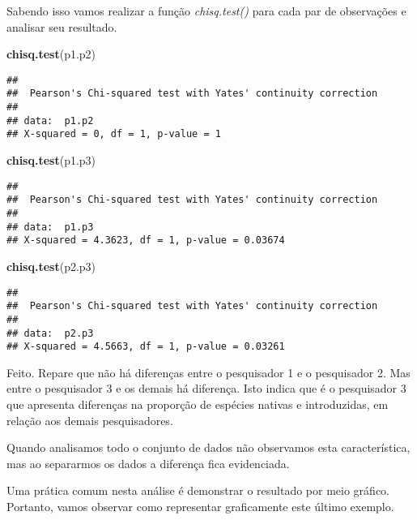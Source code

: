 \documentclass[]{book}
\newenvironment{Shaded}{\begin{snugshade}}{\end{snugshade}}
\newcommand{\KeywordTok}[1]{\textcolor[rgb]{0.13,0.29,0.53}{\textbf{#1}}}
\newcommand{\NormalTok}[1]{#1}
\begin{document}
Sabendo isso vamos realizar a função \emph{chisq.test()} para cada par de observações e analisar seu resultado.

\begin{Shaded}
\begin{Highlighting}[]
\KeywordTok{chisq.test}\NormalTok{(p1.p2)}
\end{Highlighting}
\end{Shaded}

\begin{verbatim}
## 
##  Pearson's Chi-squared test with Yates' continuity correction
## 
## data:  p1.p2
## X-squared = 0, df = 1, p-value = 1
\end{verbatim}

\begin{Shaded}
\begin{Highlighting}[]
\KeywordTok{chisq.test}\NormalTok{(p1.p3)}
\end{Highlighting}
\end{Shaded}

\begin{verbatim}
## 
##  Pearson's Chi-squared test with Yates' continuity correction
## 
## data:  p1.p3
## X-squared = 4.3623, df = 1, p-value = 0.03674
\end{verbatim}

\begin{Shaded}
\begin{Highlighting}[]
\KeywordTok{chisq.test}\NormalTok{(p2.p3)}
\end{Highlighting}
\end{Shaded}

\begin{verbatim}
## 
##  Pearson's Chi-squared test with Yates' continuity correction
## 
## data:  p2.p3
## X-squared = 4.5663, df = 1, p-value = 0.03261
\end{verbatim}

Feito. Repare que não há diferenças entre o pesquisador 1 e o pesquisador 2. Mas entre o pesquisador 3 e os demais há diferença. Isto indica que é o pesquisador 3 que apresenta diferenças na proporção de espécies nativas e introduzidas, em relação aos demais pesquisadores.

Quando analisamos todo o conjunto de dados não observamos esta característica, mas ao separarmos os dados a diferença fica evidenciada.

Uma prática comum nesta análise é demonstrar o resultado por meio gráfico. Portanto, vamos observar como representar graficamente este último exemplo.
\end{document}
